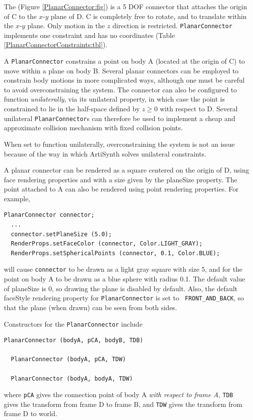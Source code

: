 The 
(Figure \ref{PlanarConnector:fig}) is a 5 DOF connector that attaches
the origin of C to the $x$-$y$ plane of D. C is completely free to
rotate, and to translate within the $x$-$y$ plane. Only motion in the
$z$ direction is restricted. {\tt PlanarConnector} implements one
constraint and has no coordinates
(Table \ref{PlanarConnectorConstraints:tbl}).

A {\tt PlanarConnector} constrains a point on body A (located at the
origin of C) to move within a plane on body B. Several planar
connectors can be employed to constrain body motions in more
complicated ways, although one must be careful to avoid
overconstraining the system. The connector can also be configured to
function {\it unilaterally}, via its {\sf unilateral} property, in
which case the point is constrained to lie in the half-space defined by
$z \ge 0$ with respect to D. Several unilateral {\tt PlanarConnector}s
can therefore be used to implement a cheap and approximate collision
mechanism with fixed collision points.

\begin{sideblock}
When set to function unilaterally, overconstraining the system is not
an issue because of the way in which ArtiSynth solves unilateral
constraints.
\end{sideblock}

A planar connector can be rendered as a square centered on the origin
of D, using face rendering properties and with a size given by the
{\sf planeSize} property. The point attached to A can also be rendered
using point rendering properties. For example,
%
\begin{lstlisting}[]
  PlanarConnector connector;
  ...
  connector.setPlaneSize (5.0);
  RenderProps.setFaceColor (connector, Color.LIGHT_GRAY);
  RenderProps.setSphericalPoints (connector, 0.1, Color.BLUE);
\end{lstlisting}
%
will cause {\tt connector} to be drawn as a light gray square with
size 5, and for the point on body A to be drawn as a blue sphere with
radius 0.1. The default value of {\sf planeSize} is 0, so drawing the
plane is disabled by default. Also, the default {\sf faceStyle}
rendering property for {\tt PlanarConnector} is set to {\tt
FRONT\_AND\_BACK}, so that the plane (when drawn) can be seen from
both sides.

Constructors for the {\tt PlanarConnector} include
\begin{lstlisting}[]
  PlanarConnector (bodyA, pCA, bodyB, TDB)

  PlanarConnector (bodyA, pCA, TDW)

  PlanarConnector (bodyA, bodyA, TDW)
\end{lstlisting}
%
where {\tt pCA} gives the connection point of body A {\it with respect
to frame A}, {\tt TDB} gives the transform from frame D
to frame B, and {\tt TDW} gives the transform from frame D to world.

